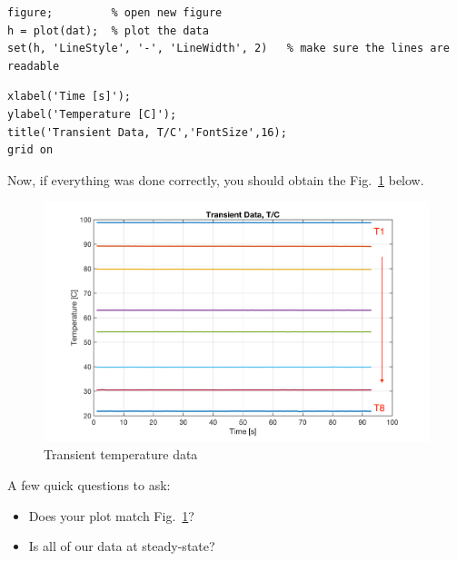 \documentclass[11pt, letterpaper]{article}
\begin{document}
\n
\begin{minipage}{\linewidth}
\begin{lstlisting}[numbers=none]
figure;         % open new figure
h = plot(dat);  % plot the data
set(h, 'LineStyle', '-', 'LineWidth', 2)   % make sure the lines are readable
\end{lstlisting}
\end{minipage}

\n
\begin{minipage}{\linewidth}
\begin{lstlisting}[numbers=none]
% don't forget to add labels!!
xlabel('Time [s]');
ylabel('Temperature [C]');
title('Transient Data, T/C','FontSize',16);
grid on
\end{lstlisting}
\end{minipage}

\n
Now, if everything was done correctly, you should obtain the Fig.~\ref{fig1} below.
\begin{figure}[H]
    \begin{center}
        \includegraphics[width=125mm]{gfx/fig1.png}
    \caption{Transient temperature data}\label{fig1}
    \end{center}
\end{figure}

A few quick questions to ask:

\begin{formal}
\begin{quest} 
\begin{itemize}
    \item Does your plot match Fig.~\ref{fig1}? 
    \item Is all of our data at steady-state?
\end{itemize}
\end{quest}
\end{formal}
\end{document}
